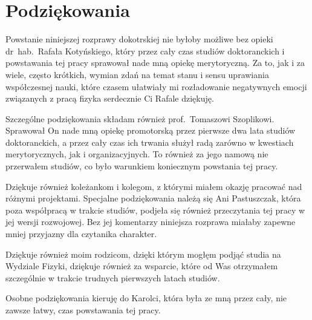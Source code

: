 \documentclass[pdflatex,11pt]{aghdpl}
\author{Marcin Stolarek}
\date{2016}
\begin{document}
\frontmatter

\titlepages

\section*{Podziękowania}
Powstanie niniejszej rozprawy dokotrskiej nie byłoby możliwe bez opieki dr~hab.~Rafała Kotyńskiego, który przez cały czas studiów doktoranckich i powstawania tej pracy sprawował nade mną opiekę merytoryczną. Za to, jak i za wiele, często krótkich, wymian zdań na temat stanu i sensu uprawiania współczesnej nauki, które czasem ułatwiały mi rozładowanie negatywnych emocji związanych z pracą fizyka serdecznie Ci Rafale dziękuję.

Szczególne podziękowania składam również prof.~Tomaszowi Szoplikowi. Sprawował On nade mną opiekę promotorską przez pierwsze dwa lata studiów doktoranckich, a przez cały czas ich trwania służył radą zarówno w kwestiach merytorycznych, jak i organizacyjnych. To również za jego namową nie przerwałem studiów, co było warunkiem koniecznym powstania tej pracy.

Dziękuje również koleżankom i kolegom, z którymi miałem okazję pracować nad różnymi projektami. Specjalne podziękowania należą się Ani Pastuszczak, która poza współpracą w trakcie studiów, podjeła się również przeczytania tej pracy w jej wersji rozwojowej. Bez jej komentarzy niniejsza rozprawa miałaby zapewne mniej przyjazny dla czytanika charakter.

Dziękuje również moim rodzicom, dzięki którym mogłęm podjąć studia na Wydziale Fizyki, dziękuje również za wsparcie, które od Was otrzymałem szczególnie w trakcie trudnych pierwszych latach studiów.  

Osobne podziękowania kieruję do Karolci, która była ze mną przez cały, nie zawsze łatwy, czas powstawania tej pracy.
\clearpage

\tableofcontents
\clearpage

\mainmatter


















\printnomenclature

%



\listoffigures
{}

\end{document}
